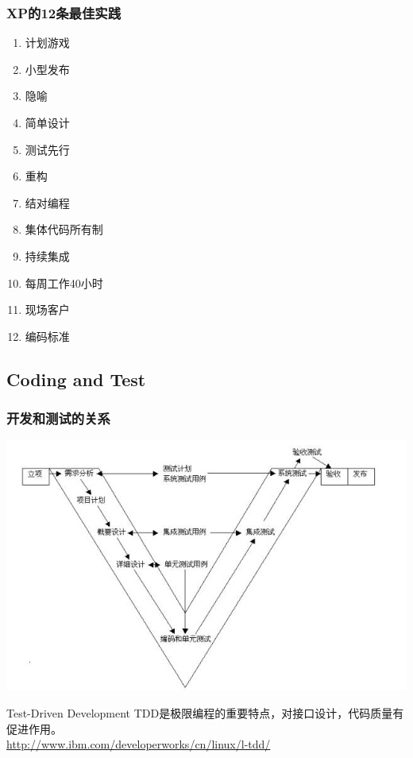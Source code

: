 \begin{frame}
  \frametitle{XP的12条最佳实践}
  \begin{enumerate}
    \item 计划游戏
    \item \alert{小型发布}
    \item 隐喻
    \item 简单设计
    \item \alert{测试先行}
    \item \alert{重构}
    \item 结对编程
    \item 集体代码所有制
    \item \alert{持续集成}
    \item 每周工作40小时
    \item 现场客户
    \item 编码标准
  \end{enumerate}
\end{frame}

\subsection{Coding and Test}
\begin{frame}
  \frametitle{开发和测试的关系}
  \centering\includegraphics[scale=.4]{images/test.jpg}
  \begin{block}{Test-Driven Development}
    \small TDD是极限编程的重要特点，对接口设计，代码质量有促进作用。\\ 
    \url{http://www.ibm.com/developerworks/cn/linux/l-tdd/}
  \end{block}
\end{frame}

